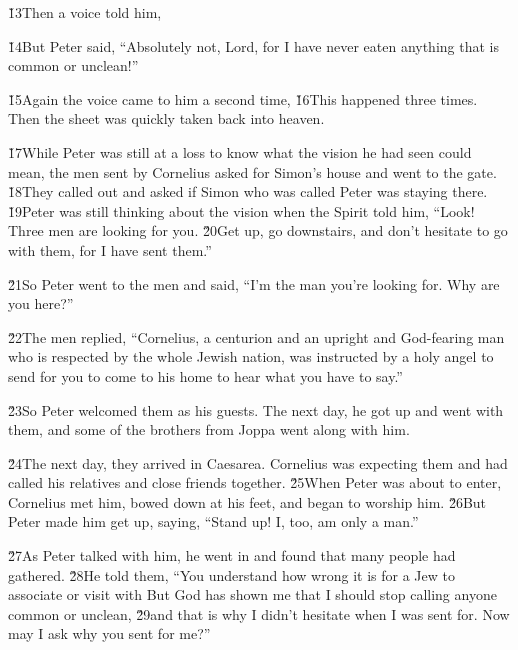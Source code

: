 \v{13}Then a voice told him, 

\v{14}But Peter said, ``Absolutely not, Lord, for I have never eaten anything that is common or unclean!''

\v{15}Again the voice came to him a second time,  \v{16}This happened three times. Then the sheet was quickly taken back into heaven.

\v{17}While Peter was still at a loss to know what the vision he had seen could mean, the men sent by Cornelius asked for Simon's house and went to the gate. \v{18}They called out and asked if Simon who was called Peter was staying there. \v{19}Peter was still thinking about the vision when the Spirit told him, ``Look! Three men are looking for you. \v{20}Get up, go downstairs, and don't hesitate to go with them, for I have sent them.''

\v{21}So Peter went to the men and said, ``I'm the man you're looking for. Why are you here?''

\v{22}The men replied, ``Cornelius, a centurion and an upright and God-fearing man who is respected by the whole Jewish nation, was instructed by a holy angel to send for you to come to his home to hear what you have to say.''

\v{23}So Peter welcomed them as his guests. The next day, he got up and went with them, and some of the brothers from Joppa went along with him.

\v{24}The next day, they arrived in Caesarea. Cornelius was expecting them and had called his relatives and close friends together. \v{25}When Peter was about to enter, Cornelius met him, bowed down at his feet, and began to worship him. \v{26}But Peter made him get up, saying, ``Stand up! I, too, am only a man.''

\v{27}As Peter talked with him, he went in and found that many people had gathered. \v{28}He told them, ``You understand how wrong it is for a Jew to associate or visit with  But God has shown me that I should stop calling anyone common or unclean, \v{29}and that is why I didn't hesitate when I was sent for. Now may I ask why you sent for me?''

